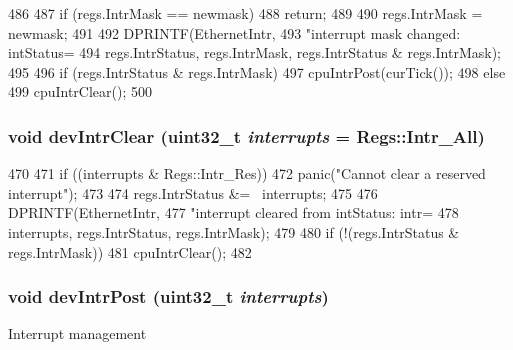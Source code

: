 \begin{DoxyCode}
486 {
487     if (regs.IntrMask == newmask)
488         return;
489 
490     regs.IntrMask = newmask;
491 
492     DPRINTF(EthernetIntr,
493             "interrupt mask changed: intStatus=%
494             regs.IntrStatus, regs.IntrMask, regs.IntrStatus & regs.IntrMask);
495 
496     if (regs.IntrStatus & regs.IntrMask)
497         cpuIntrPost(curTick());
498     else
499         cpuIntrClear();
500 }
\end{DoxyCode}
\hypertarget{classSinic_1_1Device_af2e6de78cabe5fab3233fb1b29fb478b}{
\subsubsection[{devIntrClear}]{\setlength{\rightskip}{0pt plus 5cm}void devIntrClear ({\bf uint32\_\-t} {\em interrupts} = {\ttfamily Regs::Intr\_\-All})}}
\label{classSinic_1_1Device_af2e6de78cabe5fab3233fb1b29fb478b}



\begin{DoxyCode}
470 {
471     if ((interrupts & Regs::Intr_Res))
472         panic("Cannot clear a reserved interrupt");
473 
474     regs.IntrStatus &= ~interrupts;
475 
476     DPRINTF(EthernetIntr,
477             "interrupt cleared from intStatus: intr=%
478             interrupts, regs.IntrStatus, regs.IntrMask);
479 
480     if (!(regs.IntrStatus & regs.IntrMask))
481         cpuIntrClear();
482 }
\end{DoxyCode}
\hypertarget{classSinic_1_1Device_ad1a6ea4f31e657c02d56bdf168fb988a}{
\subsubsection[{devIntrPost}]{\setlength{\rightskip}{0pt plus 5cm}void devIntrPost ({\bf uint32\_\-t} {\em interrupts})}}
\label{classSinic_1_1Device_ad1a6ea4f31e657c02d56bdf168fb988a}
Interrupt management 


